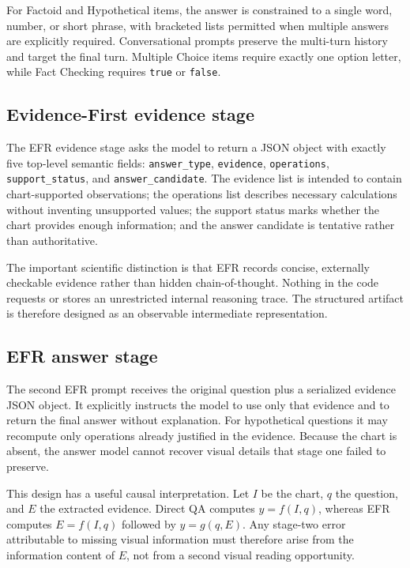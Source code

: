 \documentclass[11pt,a4paper]{article}
\newcommand{\code}[1]{\texttt{#1}}
\begin{document}
For Factoid and Hypothetical items, the answer is constrained to a single word, number, or short phrase, with bracketed lists permitted when multiple answers are explicitly required. Conversational prompts preserve the multi-turn history and target the final turn. Multiple Choice items require exactly one option letter, while Fact Checking requires \code{true} or \code{false}.

\subsection{Evidence-First evidence stage}
The EFR evidence stage asks the model to return a JSON object with exactly five top-level semantic fields: \code{answer\_type}, \code{evidence}, \code{operations}, \code{support\_status}, and \code{answer\_candidate}. The evidence list is intended to contain chart-supported observations; the operations list describes necessary calculations without inventing unsupported values; the support status marks whether the chart provides enough information; and the answer candidate is tentative rather than authoritative.

The important scientific distinction is that EFR records concise, externally checkable evidence rather than hidden chain-of-thought. Nothing in the code requests or stores an unrestricted internal reasoning trace. The structured artifact is therefore designed as an observable intermediate representation.

\subsection{EFR answer stage}
The second EFR prompt receives the original question plus a serialized evidence JSON object. It explicitly instructs the model to use only that evidence and to return the final answer without explanation. For hypothetical questions it may recompute only operations already justified in the evidence. Because the chart is absent, the answer model cannot recover visual details that stage one failed to preserve.

This design has a useful causal interpretation. Let \(I\) be the chart, \(q\) the question, and \(E\) the extracted evidence. Direct QA computes \(y=f(I,q)\), whereas EFR computes \(E=f(I,q)\) followed by \(y=g(q,E)\). Any stage-two error attributable to missing visual information must therefore arise from the information content of \(E\), not from a second visual reading opportunity.
\end{document}
